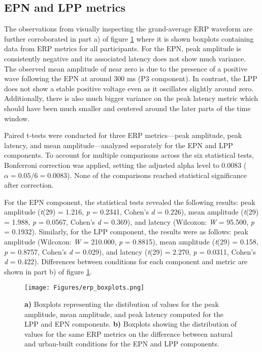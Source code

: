 \subsection{EPN and LPP metrics}

The observations from visually inspecting the grand-average ERP waveform are further corroborated in part a) of figure \ref{fig:erp_boxplots} where it is shown boxplots containing data from ERP metrics for all participants. For the EPN, peak amplitude is consistently negative and its associated latency does not show much variance. The observed mean amplitude of near zero is due to the presence of a positive wave following the EPN at around 300 ms (P3 component). In contrast, the LPP does not show a stable positive voltage even as it oscillates slightly around zero. Additionally, there is also much bigger variance on the peak latency metric which should have been much smaller and centered around the later parts of the time window.

Paired t-tests were conducted for three ERP metrics—peak amplitude, peak latency, and mean amplitude—analyzed separately for the EPN and LPP components. To account for multiple comparisons across the six statistical tests, Bonferroni correction was applied, setting the adjusted alpha level to 0.0083 ($\alpha = 0.05/6 = 0.0083$). None of the comparisons reached statistical significance after correction.

For the EPN component, the statistical tests revealed the following results: peak amplitude (\textit{t}(29) = 1.216, \textit{p} = 0.2341, Cohen's \textit{d} = 0.226), mean amplitude (\textit{t}(29) = 1.988, \textit{p} = 0.0567, Cohen's \textit{d} = 0.369), and latency (Wilcoxon: \textit{W} = 95.500, \textit{p} = 0.1932). Similarly, for the LPP component, the results were as follows: peak amplitude (Wilcoxon: \textit{W} = 210.000, \textit{p} = 0.8815), mean amplitude (\textit{t}(29) = 0.158, \textit{p} = 0.8757, Cohen's \textit{d} = 0.029), and latency (\textit{t}(29) = 2.270, \textit{p} = 0.0311, Cohen's \textit{d} = 0.422). Differences between conditions for each component and metric are shown in part b) of figure \ref{fig:erp_boxplots}.

\begin{figure}[H]
	\centering
	\texttt{[image: Figures/erp\_boxplots.png]}
	\caption{\textbf{a)} Boxplots representing the distibution of values for the peak amplitude, mean amplitude, and peak latency computed for the LPP and EPN components. \textbf{b)} Boxplots showing the distribution of values for the same ERP metrics on the difference between natural and urban-built conditions for the EPN and LPP components. \label{fig:erp_boxplots}}
\end{figure}


